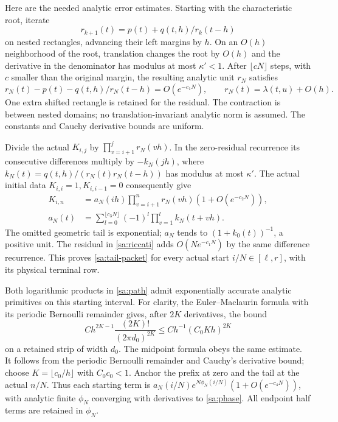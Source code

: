 \documentclass[11pt]{article}
\numberwithin{equation}{section}
\theoremstyle{definition}\newtheorem{definition}[theorem]{Definition}
\theoremstyle{remark}\newtheorem{remark}[theorem]{Remark}
\begin{document}
Here are the needed analytic error estimates. Starting with the
characteristic root, iterate
\[
 r_{k+1}(t)=p(t)+q(t,h)/r_k(t-h)
\]
on nested rectangles, advancing their left margins by $h$. On an
$O(h)$ neighborhood of the root, translation changes the root by
$O(h)$ and the derivative in the denominator has modulus at most
$\kappa'<1$. After $\lfloor cN\rfloor$ steps, with $c$ smaller than
the original margin, the resulting analytic unit $r_N$ satisfies
\begin{equation}\label{sa:riccati}
 r_N(t)-p(t)-q(t,h)/r_N(t-h)=O(e^{-c_1N}),\qquad
                         r_N(t)=\lambda(t,u)+O(h).
\end{equation}
One extra shifted rectangle is retained for the residual. The contraction
is between nested domains; no translation-invariant analytic norm is
assumed. The constants and Cauchy derivative bounds are uniform.

Divide the actual $K_{i,j}$ by $\prod_{v=i+1}^j r_N(vh)$. In the
zero-residual recurrence its consecutive differences multiply by
$-k_N(jh)$, where
$k_N(t)=q(t,h)/(r_N(t)r_N(t-h))$ has modulus at most $\kappa'$.
The actual initial data $K_{i,i}=1,K_{i,i-1}=0$ consequently give
\begin{align}
 K_{i,n}&=a_N(ih)\prod_{v=i+1}^n r_N(vh)(1+O(e^{-c_2N})),
                                                       \label{sa:tail-packet}\\
 a_N(t)&=\sum_{l=0}^{\lfloor c_3N\rfloor}
                  (-1)^l\prod_{v=1}^l k_N(t+vh).
\end{align}
The omitted geometric tail is exponential; $a_N$ tends to
$(1+k_0(t))^{-1}$, a positive unit. The residual in
\eqref{sa:riccati} adds $O(Ne^{-c_1N})$ by the same difference
recurrence. This proves \eqref{sa:tail-packet} for every actual start
$i/N\in[\ell,r]$, with its physical terminal row.

Both logarithmic products in \eqref{sa:path} admit exponentially
accurate analytic primitives on this starting interval. For clarity,
the Euler--Maclaurin formula with its periodic Bernoulli remainder
\cite[\S2.10(i)]{DLMF} gives, after $2K$ derivatives, the bound
\[
 C h^{2K-1}\frac{(2K)!}{(2\pi d_0)^{2K}}
                   \le C h^{-1}(C_0Kh)^{2K}
\]
on a retained strip of width $d_0$. The midpoint formula obeys the
same estimate. It follows from the periodic Bernoulli remainder and
Cauchy's derivative bound; choose $K=\lfloor c_0/h\rfloor$ with
$C_0c_0<1$. Anchor the prefix at zero and the tail at the actual
$n/N$. Thus each starting term is
$a_N(i/N)e^{N\phi_N(i/N)}(1+O(e^{-c_4N}))$, with analytic finite
$\phi_N$ converging with derivatives to \eqref{sa:phase}.
All endpoint half terms are retained in $\phi_N$.
\end{document}
